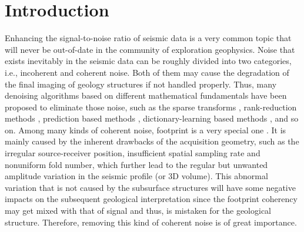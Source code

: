 \section{Introduction}
Enhancing the signal-to-noise ratio of seismic data is a very common topic that will never be out-of-date in the community of exploration geophysics. Noise that exists inevitably in the seismic data can be roughly divided into two categories, i.e., incoherent and coherent noise. Both of them may cause the degradation of the final imaging of geology structures if not handled properly. Thus, many denoising algorithms based on different mathematical fundamentals have been proposed to eliminate those noise, such as the sparse transforms \cite{Yaru2014Radon,Benfeng2014POCS,mostafa2017geo,Min2019Gaussian}, rank-reduction methods \cite{Yangkang2016drr,Yangkang2019orr}, prediction based methods \cite{Spitz1991fx,Chao2018Adap,Guochang2019Multi}, dictionary-learning based methods \cite{yangkang2016double,amir2017geo,amir2017,yangkang2019sparse}, and so on. Among many kinds of coherent noise, footprint is a very special one \cite{Marfurt1998ft}. It is mainly caused by the inherent drawbacks of the acquisition geometry, such as the irregular source-receiver position, insufficient spatial sampling rate and nonuniform fold number, which further lead to the regular but unwanted amplitude variation in the seismic profile (or 3D volume). This abnormal variation that is not caused by the subsurface structures will have some negative impacts on the subsequent geological interpretation since the footprint coherency may get mixed with that of signal and thus, is mistaken for the geological structure. Therefore, removing this kind of coherent noise is of great importance.

